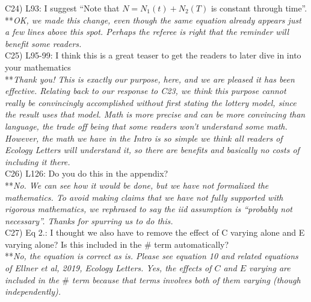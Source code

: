 \documentclass[letterpaper,11pt]{article}
\begin{document}
\noindent C24) L93: I suggest ``Note that $N = N_1(t) + N_2(T)$ is constant through time''. \\

\noindent ***\emph{OK, we made this change, even though the same equation already appears just a few lines
above this spot. Perhaps the referee is right that the reminder will benefit some readers.} \\

\noindent C25) L95-99: I think this is a great teaser to get the readers to later dive in into your mathematics \\

\noindent ***\emph{Thank you! This is exactly our purpose, here, and we are pleased it has been effective.
Relating back to our response to C23, we think this purpose cannot really be convincingly accomplished
without first stating the lottery model, since the result uses that model. Math is more precise and can be
more convincing than language, the trade off being that some readers won't understand some math. However, the 
math we have in the Intro is so simple we think all readers of Ecology Letters will understand it, so there are
benefits and basically no costs of including it there. } \\

\noindent C26) L126: Do you do this in the appendix? \\

\noindent ***\emph{No. We can see how it would be done, but we have not formalized the mathematics. 
To avoid making claims that we have not fully supported
with rigorous mathematics, we rephrased to say the iid assumption is 
``probably not necessary''. Thanks for spurring us to do this.} \\

\noindent C27) Eq 2.: I thought we also have to remove the effect of C varying alone and E varying alone? Is this included in the $\#$ term automatically? \\

\noindent ***\emph{No, the equation is correct as is. Please see equation 10 and related equations of 
Ellner et al, 2019, Ecology Letters. Yes, the effects of $C$ and $E$ varying are included in 
the $\#$ term because that terms involves both of them varying (though independently).}
\end{document}
